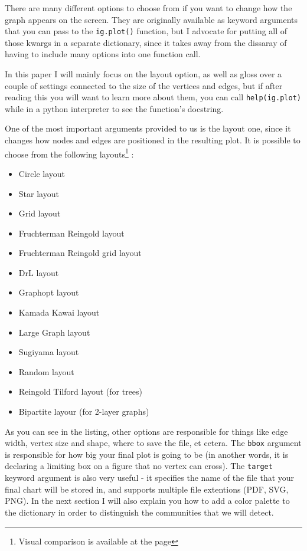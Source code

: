 \documentclass[12pt, a4paper]{article}
\begin{document}


There are many different options to choose from if you want to change how the graph appears on the screen. They are originally available as keyword arguments that you can pass to the \texttt{ig.plot()} function, but I advocate for putting all of those kwargs in a separate dictionary,  since it takes away from the dissaray of having to include many options into one function call.

In this paper I will mainly focus on the layout option, as well as gloss over a couple of settings connected to the size of the vertices and edges, but if after reading this you will want to learn more about them, you can call \texttt{help(ig.plot)} while in a python interpreter to see the function's docstring.

One of the most important arguments provided to us is the layout one, since it changes how nodes and edges are positioned in the resulting plot. It is possible to choose from the following layouts\footnote{Visual comparison is available at the page} :

\begin{multicols}{2}
  \begin{itemize}
  \item Circle layout
  \item Star layout
  \item Grid layout
  \item Fruchterman Reingold layout
  \item Fruchterman Reingold grid layout
  \item DrL layout
  \item Graphopt layout
  \item Kamada Kawai layout
  \item Large Graph layout
  \item Sugiyama layout
  \item Random layout
  \item Reingold Tilford layout (for trees)
  \item Bipartite layour (for 2-layer graphs)
  \end{itemize}
\end{multicols}

As you can see in the listing, other options are responsible for things like edge width, vertex size and shape, where to save the file, et cetera. The \texttt{bbox} argument is responsible for how big your final plot is going to be (in another words, it is declaring a limiting box on a figure that no vertex can cross). The \texttt{target} keyword argument is also very useful - it specifies the name of the file that your final chart will be stored in, and supports multiple file extentions (PDF, SVG, PNG).  In the next section I will also explain you how to add a color palette to the dictionary in order to distinguish the communities that we will detect.
\end{document}
